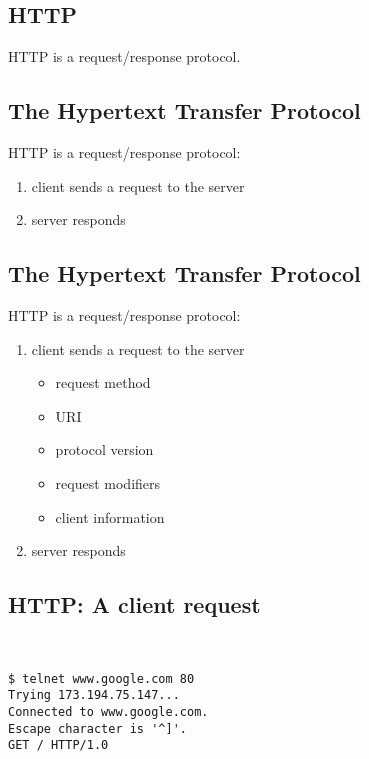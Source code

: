 \documentclass[xga]{xdvislides}
\begin{document}
\subsection{HTTP}
\vspace{.5in}
\begin{center}
	\Huge
	HTTP is a request/response protocol.
\end{center}
\Normalsize

\subsection{The Hypertext Transfer Protocol}
HTTP is a request/response protocol:
\begin{enumerate}
	\item client sends a request to the server
	\item server responds
\end{enumerate}

\subsection{The Hypertext Transfer Protocol}
HTTP is a request/response protocol:
\begin{enumerate}
	\item client sends a request to the server
		\begin{itemize}
			\item request method
			\item URI
			\item protocol version
			\item request modifiers
			\item client information
		\end{itemize}
	\item server responds
\end{enumerate}

\subsection{HTTP: A client request}
\vspace*{.5in}
\\
\Hugesize
\begin{center}
\begin{verbatim}
$ telnet www.google.com 80
Trying 173.194.75.147...
Connected to www.google.com.
Escape character is '^]'.
GET / HTTP/1.0
\end{verbatim}
\end{center}
\Normalsize
\vspace*{\fill}
\end{document}
